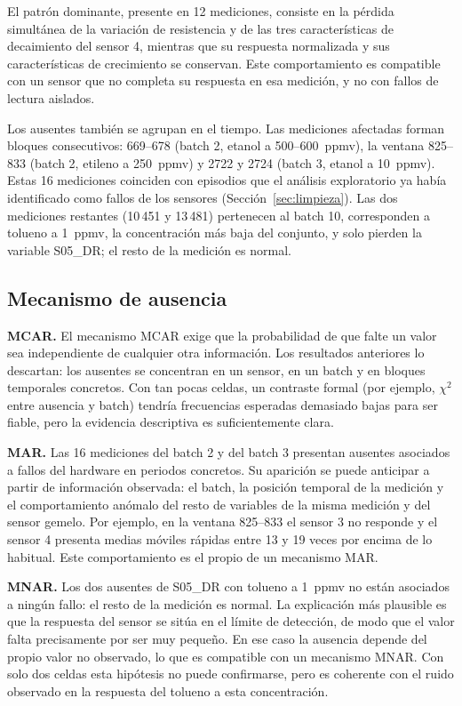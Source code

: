 El patrón dominante, presente en 12 mediciones, consiste en la pérdida simultánea de la
variación de resistencia y de las tres características de decaimiento del sensor 4, mientras
que su respuesta normalizada y sus características de crecimiento se conservan. Este
comportamiento es compatible con un sensor que no completa su respuesta en esa medición, y no
con fallos de lectura aislados.

Los ausentes también se agrupan en el tiempo. Las mediciones afectadas forman bloques
consecutivos: 669--678 (batch 2, etanol a 500--600~ppmv), la ventana 825--833 (batch 2,
etileno a 250~ppmv) y 2722 y 2724 (batch 3, etanol a 10~ppmv). Estas 16 mediciones coinciden
con episodios que el análisis exploratorio ya había identificado como fallos de los sensores
(Sección~\ref{sec:limpieza}). Las dos mediciones restantes (10\,451 y 13\,481) pertenecen al
batch 10, corresponden a tolueno a 1~ppmv, la concentración más baja del conjunto, y solo
pierden la variable S05\_DR; el resto de la medición es normal.

\subsection{Mecanismo de ausencia}

\textbf{MCAR.} El mecanismo MCAR exige que la probabilidad de que falte un valor sea
independiente de cualquier otra información. Los resultados anteriores lo descartan: los
ausentes se concentran en un sensor, en un batch y en bloques temporales concretos. Con tan
pocas celdas, un contraste formal (por ejemplo, $\chi^2$ entre ausencia y batch) tendría
frecuencias esperadas demasiado bajas para ser fiable, pero la evidencia descriptiva es
suficientemente clara.

\textbf{MAR.} Las 16 mediciones del batch 2 y del batch 3 presentan ausentes asociados a fallos
del hardware en periodos concretos. Su aparición se puede anticipar a partir de información
observada: el batch, la posición temporal de la medición y el comportamiento anómalo del resto
de variables de la misma medición y del sensor gemelo. Por ejemplo, en la ventana 825--833 el
sensor 3 no responde y el sensor 4 presenta medias móviles rápidas entre 13 y 19 veces por
encima de lo habitual. Este comportamiento es el propio de un mecanismo MAR.

\textbf{MNAR.} Los dos ausentes de S05\_DR con tolueno a 1~ppmv no están asociados a ningún
fallo: el resto de la medición es normal. La explicación más plausible es que la respuesta del
sensor se sitúa en el límite de detección, de modo que el valor falta precisamente por ser muy
pequeño. En ese caso la ausencia depende del propio valor no observado, lo que es compatible
con un mecanismo MNAR. Con solo dos celdas esta hipótesis no puede confirmarse, pero es
coherente con el ruido observado en la respuesta del tolueno a esta concentración.

